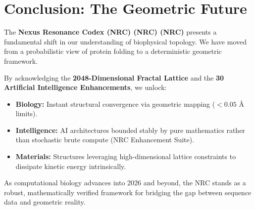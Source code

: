 \section{Conclusion: The Geometric Future}

The \textbf{Nexus Resonance Codex (NRC) (NRC) (NRC)} presents a fundamental shift in our understanding of biophysical topology. We have moved from a probabilistic view of protein folding to a deterministic geometric framework.

By acknowledging the \textbf{2048-Dimensional Fractal Lattice} and the \textbf{30 Artificial Intelligence Enhancements}, we unlock:
\begin{itemize}
	\item \textbf{Biology:} Instant structural convergence via geometric mapping ($< 0.05 \text{ \AA}$ limits).
	\item \textbf{Intelligence:} AI architectures bounded stably by pure mathematics rather than stochastic brute compute (NRC Enhancement Suite).
	\item \textbf{Materials:} Structures leveraging high-dimensional lattice constraints to dissipate kinetic energy intrinsically.
\end{itemize}

As computational biology advances into 2026 and beyond, the NRC stands as a robust, mathematically verified framework for bridging the gap between sequence data and geometric reality.

